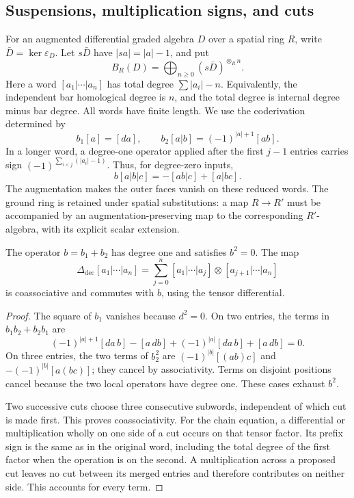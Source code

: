 \subsection{Suspensions, multiplication signs, and cuts}

For an augmented differential graded algebra \(D\) over a spatial
ring \(R\), write
\(\bar D=\ker\varepsilon_D\).  Let \(s\bar D\) have
\(|sa|=|a|-1\), and put
\[
 B_R(D)=\bigoplus_{n\ge0}(s\bar D)^{\otimes_R n}.
\]
Here a word \([a_1|\cdots|a_n]\) has total degree
\(\sum|a_i|-n\).  Equivalently, the independent bar homological
degree is \(n\), and the total degree is internal degree minus
bar degree.  All words have finite length.  We use the coderivation
determined by
\begin{equation}\label{sb:eq:bar-signs}
 b_1[a]=[da],\qquad
 b_2[a|b]=(-1)^{|a|+1}[ab].
\end{equation}
In a longer word, a degree-one operator applied after the first
\(j-1\) entries carries sign
\((-1)^{\sum_{i<j}(|a_i|-1)}\).
Thus, for degree-zero inputs,
\[
 b[a|b|c]=-[ab|c]+[a|bc].
\]
The augmentation makes the outer faces vanish on these reduced words.
The ground ring is retained under spatial substitutions: a map
\(R\to R'\) must be accompanied by an augmentation-preserving
map to the corresponding \(R'\)-algebra, with its explicit scalar extension.

\begin{lemma}\label{sb:lem:bar}
The operator \(b=b_1+b_2\) has degree one and satisfies \(b^2=0\).
The map
\[
 \Delta_{\mathrm{dec}}[a_1|\cdots|a_n]
 =\sum_{j=0}^n[a_1|\cdots|a_j]\otimes[a_{j+1}|\cdots|a_n]
\]
is coassociative and commutes with \(b\), using the tensor differential.
\end{lemma}

\begin{proof}
The square of \(b_1\) vanishes because \(d^2=0\).
On two entries, the terms in \(b_1b_2+b_2b_1\) are
\[
 (-1)^{|a|+1}[da\,b]-[a\,db]
 +(-1)^{|a|}[da\,b]+[a\,db]=0.
\]
On three entries, the two terms of \(b_2^2\) are
\((-1)^{|b|}[(ab)c]\) and
\(-(-1)^{|b|}[a(bc)]\); they cancel by associativity.
Terms on disjoint positions cancel because the two local operators
have degree one.  These cases exhaust \(b^2\).

Two successive cuts choose three consecutive subwords, independent
of which cut is made first.  This proves coassociativity.
For the chain equation, a differential or multiplication wholly on
one side of a cut occurs on that tensor factor.  Its prefix sign is
the same as in the original word, including the total degree of the
first factor when the operation is on the second.  A multiplication
across a proposed cut leaves no cut between its merged entries and
therefore contributes on neither side.  This accounts for every term.
\end{proof}

